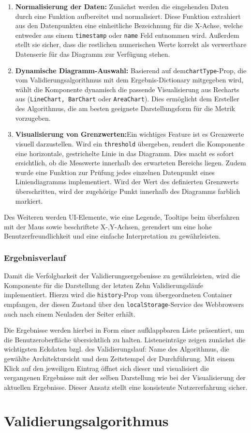 \begin{enumerate}
  \item \textbf{Normalisierung der Daten:} Zunächst werden die eingehenden Daten durch eine Funktion aufbereitet und normalisiert. Diese Funktion extrahiert aus den Datenpunkten eine einheitliche Bezeichnung für die X-Achse, welche entweder aus einem \texttt{timestamp} oder \texttt{name} Feld entnommen wird. Außerdem stellt sie sicher, dass die restlichen numerischen Werte korrekt als verwertbare Datenserie für das Diagramm zur Verfügung stehen.
  \item \textbf{Dynamische Diagramm-Auswahl:} Basierend auf dem\texttt{chartType}-Prop, die vom Validierungsalgorithmus mit dem Ergebnis-Dictionary mitgegeben wird, wählt die Komponente dynamisch die passende Visualisierung aus Recharts aus (\texttt{LineChart, BarChart} oder \texttt{AreaChart}). Dies ermöglicht dem Ersteller des Algorithmus, die am besten geeignete Darstellungsform für die Metrik vorzugeben.
  \item \textbf{Visualisierung von Grenzwerten:}Ein wichtiges Feature ist es Grenzwerte visuell darzustellen. Wird ein \texttt{threshold} übergeben, rendert die Komponente eine horizontale, gestrichelte Linie in das Diagramm. Dies macht es sofort ersichtlich, ob die Messwerte innerhalb des erwarteten Bereichs liegen. Zudem wurde eine Funktion zur Prüfung jedes einzelnen Datenpunkt eines Liniendiagramms implementiert. Wird der Wert des definierten Grenzwerts überschritten, wird der zugehörige Punkt innerhalb des Diagramms farblich markiert.
\end{enumerate}

Des Weiteren werden UI-Elemente, wie eine Legende, Tooltips beim überfahren mit der Maus sowie beschriftete X-,Y-Achsen, gerendert um eine hohe Benutzerfreundlichkeit und eine einfache Interpretation zu gewährleisten.

\subsubsection*{Ergebnisverlauf}

Damit die Verfolgbarkeit der Validierungsergebenisse zu gewährleisten, wird die Komponente für die Darstellung der letzten Zehn Validierungsläufe implementiert. Hierzu wird die \texttt{history}-Prop vom übergeordneten Container empfangen, der diesen Zustand über den \texttt{localStorage}-Service des Webbrowsers auch nach einem Neuladen der Seiter erhält.

Die Ergebnisse werden hierbei in Form einer aufklappbaren Liste präsentiert, um die Benutzeroberfläche übersichtlich zu halten. Listeneinträge zeigen zunächst die wichtigsten Eckdaten bzgl. des Validierungslauf: Name des Algorithmus, die gewählte Architektursicht und dem Zeitstempel der Durchführung. Mit einem Klick auf den jeweiligen Eintrag öffnet sich dieser und visualisiert die vergangenen Ergebnisse mit der selben Darstellung wie bei der Visualisierung der aktuellen Ergebnisse. Dieser Ansatz stellt eine konsistente Nutzererfahrung sicher.
\section{Validierungsalgorithmus}
\label{sec:validimp}
